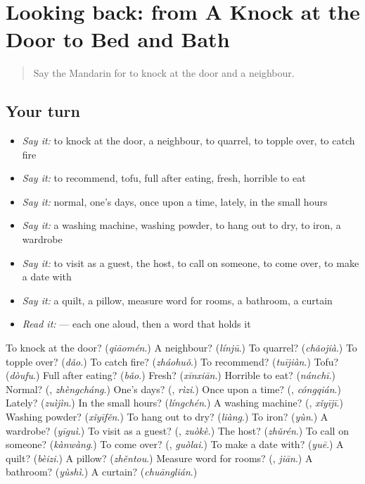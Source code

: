 \section[(dialogue)]{Looking back: from A Knock at the Door to Bed and Bath}

\label{lesson:ZH-R181-review-176-181}



\begin{quote}
Say the Mandarin for to knock at the door and a neighbour.
\end{quote}

\subsection*{Your turn}
\begin{itemize}
\raggedright
  \item \emph{Say it:} to knock at the door, a neighbour, to quarrel, to topple over, to catch fire
  \item \emph{Say it:} to recommend, tofu, full after eating, fresh, horrible to eat
  \item \emph{Say it:} normal, one's days, once upon a time, lately, in the small hours
  \item \emph{Say it:} a washing machine, washing powder, to hang out to dry, to iron, a wardrobe
  \item \emph{Say it:} to visit as a guest, the host, to call on someone, to come over, to make a date with
  \item \emph{Say it:} a quilt, a pillow, measure word for rooms, a bathroom, a curtain
  \item \emph{Read it:}   — each one aloud, then a word that holds it
\end{itemize}

\begin{tcolorbox}[breakable,colback=teal!4,colframe=teal!35!black,title={Before you move on}]
To knock at the door? (\emph{qiāomén}.) A neighbour? (\emph{línjū}.) To quarrel? (\emph{chǎojià}.) To topple over? (\emph{dǎo}.) To catch fire? (\emph{zháohuǒ}.) To recommend? (\emph{tuījiàn}.) Tofu? (\emph{dòufu}.) Full after eating? (\emph{bǎo}.) Fresh? (\emph{xīnxiān}.) Horrible to eat? (\emph{nánchī}.) Normal? (\textbf{}, \emph{zhèngcháng}.) One's days? (\textbf{}, \emph{rìzi}.) Once upon a time? (\textbf{}, \emph{cóngqián}.) Lately? (\emph{zuìjìn}.) In the small hours? (\emph{língchén}.) A washing machine? (\textbf{}, \emph{xǐyījī}.) Washing powder? (\emph{xǐyīfěn}.) To hang out to dry? (\emph{liàng}.) To iron? (\emph{yùn}.) A wardrobe? (\emph{yīguì}.) To visit as a guest? (\textbf{}, \emph{zuòkè}.) The host? (\emph{zhǔrén}.) To call on someone? (\emph{kànwàng}.) To come over? (\textbf{}, \emph{guòlai}.) To make a date with? (\emph{yuē}.) A quilt? (\emph{bèizi}.) A pillow? (\emph{zhěntou}.) Measure word for rooms? (\textbf{}, \emph{jiān}.) A bathroom? (\emph{yùshì}.) A curtain? (\emph{chuānglián}.)
\end{tcolorbox}

